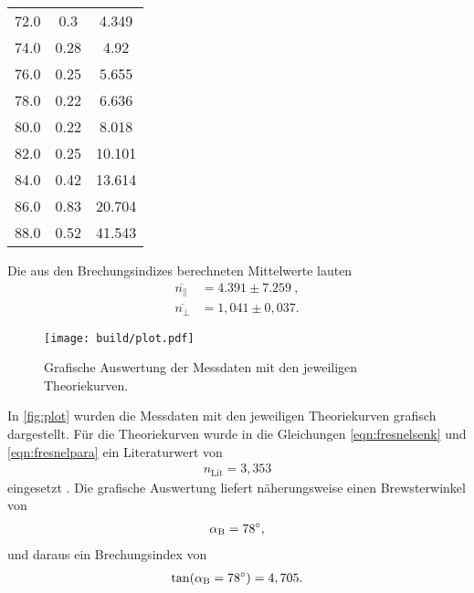 \begin{table}[H]
\begin{tabular}{c c c}
        72.0  &  0.3  &  4.349  \\
        74.0  &  0.28  &  4.92  \\
        76.0  &  0.25  &  5.655  \\
        78.0  &  0.22  &  6.636  \\
        80.0  &  0.22  &  8.018  \\
        82.0  &  0.25  &  10.101  \\
        84.0  &  0.42  &  13.614  \\
        86.0  &  0.83  &  20.704  \\
        88.0  &  0.52  &  41.543  \\
        \bottomrule
    \end{tabular}
\end{table}


\noindent
Die aus den Brechungsindizes berechneten Mittelwerte lauten
\begin{align*}
    \overline{n_\parallel} &=  4.391 \pm 7.259 \ , \\
    \overline{n_\perp} &= 1,041 \pm 0,037.
\end{align*}


\begin{figure}[H]
    \centering
    \texttt{[image: build/plot.pdf]}
    \caption{Grafische Auswertung der Messdaten mit den jeweiligen Theoriekurven.}
    \label{fig:plot}
\end{figure}

\noindent
In \autoref{fig:plot} wurden die Messdaten mit den jeweiligen Theoriekurven grafisch dargestellt. Für die Theoriekurven wurde in die Gleichungen \eqref{eqn:fresnelsenk} und \eqref{eqn:fresnelpara}
ein Literaturwert von
\begin{align*}
    n_{\text{Lit}} = 3,353
\end{align*}
eingesetzt \cite{BrechSilizium}. Die grafische Auswertung liefert näherungsweise einen Brewsterwinkel von  
\begin{align*}
    \alpha_{\text B} = \SI{78}{\degree},
\end{align*}
und daraus ein Brechungsindex von 
\begin{align*}
    \tan(\alpha_{\text B} = \SI{78}{\degree}) = 4,705.
\end{align*}